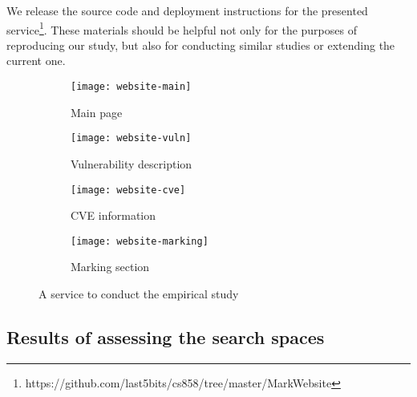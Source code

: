 We release the source code and deployment instructions for the presented service\footnote{https://github.com/last5bits/cs858/tree/master/MarkWebsite}.
These materials should be helpful not only for the purposes of reproducing our study, but also for conducting similar studies or extending the current one.

\begin{figure}[t!]

\begin{subfigure}[b]{\linewidth}
    \texttt{[image: website-main]}
    \caption{Main page}
    \label{figure:website-main}
\end{subfigure}

\begin{subfigure}[b]{\linewidth}
    \texttt{[image: website-vuln]}
    \caption{Vulnerability description}
    \label{figure:website-vuln}
\end{subfigure}

\begin{subfigure}[b]{\linewidth}
    \texttt{[image: website-cve]}
    \caption{CVE information}
    \label{figure:website-cve}
\end{subfigure}

\begin{subfigure}[b]{\linewidth}
    \texttt{[image: website-marking]}
    \caption{Marking section}
    \label{figure:website-marking}
\end{subfigure}

\caption{A service to conduct the empirical study}
\label{figure:website}
\end{figure}

\subsection{Results of assessing the search spaces}
